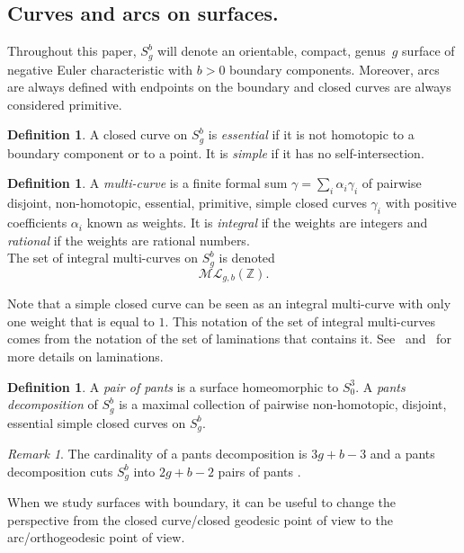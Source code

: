 \documentclass[a4paper,12pt]{article}
\theoremstyle{definition}
\newtheorem{definition}[theorem]{Definition}
\theoremstyle{remark}
\newtheorem{rem}[theorem]{Remark}
\begin{document}
\subsection{Curves and arcs on surfaces.}
Throughout this paper, $S_g^b$ will denote an orientable, compact, genus~$g$ surface of negative Euler characteristic with $b>0$ boundary components. Moreover, arcs are always defined with endpoints on the boundary and closed curves are always considered primitive.


\begin{definition}
    A closed curve on $S_g^b$ is \emph{essential} if it is not homotopic to a boundary component or to a point. It is \emph{simple} if it has no self-intersection.
\end{definition}


\begin{definition}
    A \emph{multi-curve} is a finite formal sum $\gamma = \sum_i\alpha_i\gamma_i$ of pairwise disjoint, non-homotopic, essential, primitive, simple closed curves $\gamma_i$ with positive coefficients $\alpha_i$ known as weights. It is \emph{integral} if the weights are integers and \emph{rational} if the weights are rational numbers.\\
    The set of integral multi-curves on $S_g^{b}$ is denoted
    \[
        \mathcal{ML}_{g,b}(\mathbb{Z}).
    \]
\end{definition}
Note that a simple closed curve can be seen as an integral multi-curve with only one weight that is equal to $1$.
This notation of the set of integral multi-curves comes from the notation of the set of laminations that contains it. See~\cite{thurstonWork} and~\cite{VivekaJuan} for more details on laminations. 



\begin{definition}
    A \emph{pair of pants} is a surface homeomorphic to $S_0^3$.
    A \emph{pants decomposition} of $S_g^b$ is a maximal collection of pairwise non-homotopic, disjoint, essential simple closed curves on $S_g^b$.
\end{definition}

\begin{rem}
    The cardinality of a pants decomposition is $3g+b-3$ and a pants decomposition cuts $S_g^b$ into $2g+b-2$ pairs of pants \cite{TeichBord}. 
\end{rem}



When we study surfaces with boundary, it can be useful to change the perspective from the closed curve/closed geodesic point of view to the arc/orthogeodesic point of view. 
\end{document}
